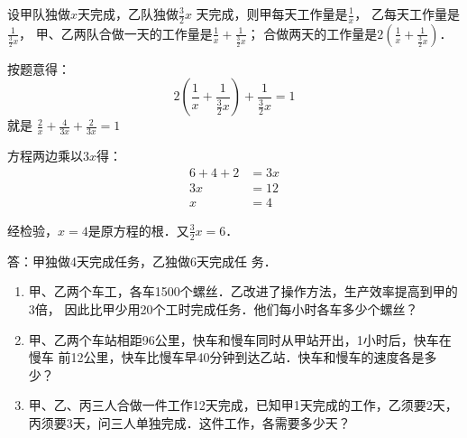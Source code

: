 \begin{solution}
    设甲队独做$x$天完成，乙队独做$\frac{3}{2}x$
天完成，则甲每天工作量是$\frac{1}{x}$，
乙每天工作量是$\frac{1}{\tfrac{3}{2}x}$，
甲、乙两队合做一天的工作量是$\frac{1}{x}+\frac{\ 1\ }{\frac{3}{2}x}$；
合做两天的工作量是$2\left(\frac{1}{x}+\frac{1}{\frac{3}{2}x}\right)$．

按题意得：
\[2\left(\frac{1}{x}+\frac{\ 1\ }{\frac{3}{2}x}\right)+\frac{\ 1\ }{\frac{3}{2}x}=1\]
就是 $\frac{2}{x}+\frac{4}{3x}+\frac{2}{3x}=1$

方程两边乘以$3x$得：
\[\begin{split}
   6+4+2&=3x\\
3x&=12\\
x&=4 
\end{split}\]

经检验，$x=4$是原方程的根．又$\frac{3}{2}x=6$．

答：甲独做4天完成任务，乙独做6天完成任
务．
\end{solution}

\begin{ex}
\begin{enumerate}
    \item 甲、乙两个车工，各车1500个螺丝．乙改进了操作方法，生产效率提高到甲的3倍，
    因此比甲少用20个工时完成任务．他们每小时各车多少个螺丝？
    \item 甲、乙两个车站相距96公里，快车和慢车同时从甲站开出，1小时后，快车在慢车
    前12公里，快车比慢车早40分钟到达乙站．快车和慢车的速度各是多少？
    \item 甲、乙、丙三人合做一件工作12天完成，已知甲1天完成的工作，乙须要2天，
    丙须要3天，问三人单独完成．这件工作，各需要多少天？
\end{enumerate}    
\end{ex}

